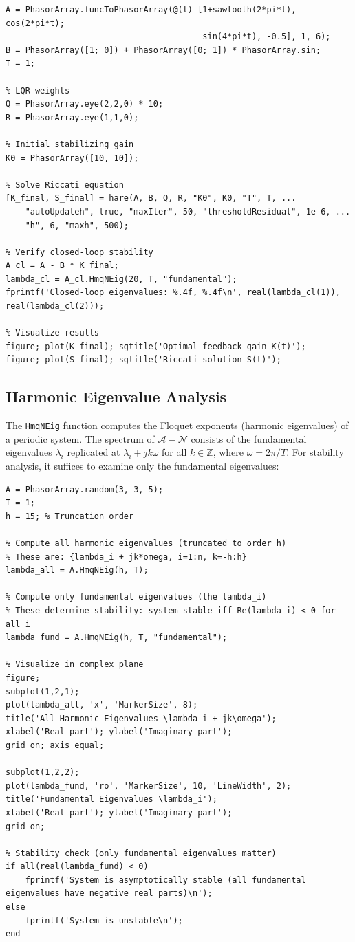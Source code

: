 \documentclass[11pt,a4paper]{article}
\begin{document}
\begin{lstlisting}[style=matlabstyle]
% Define system matrices
A = PhasorArray.funcToPhasorArray(@(t) [1+sawtooth(2*pi*t), cos(2*pi*t); 
                                        sin(4*pi*t), -0.5], 1, 6);
B = PhasorArray([1; 0]) + PhasorArray([0; 1]) * PhasorArray.sin;
T = 1;

% LQR weights
Q = PhasorArray.eye(2,2,0) * 10;
R = PhasorArray.eye(1,1,0);

% Initial stabilizing gain
K0 = PhasorArray([10, 10]);

% Solve Riccati equation
[K_final, S_final] = hare(A, B, Q, R, "K0", K0, "T", T, ...
    "autoUpdateh", true, "maxIter", 50, "thresholdResidual", 1e-6, ...
    "h", 6, "maxh", 500);

% Verify closed-loop stability
A_cl = A - B * K_final;
lambda_cl = A_cl.HmqNEig(20, T, "fundamental");
fprintf('Closed-loop eigenvalues: %.4f, %.4f\n', real(lambda_cl(1)), real(lambda_cl(2)));

% Visualize results
figure; plot(K_final); sgtitle('Optimal feedback gain K(t)');
figure; plot(S_final); sgtitle('Riccati solution S(t)');
\end{lstlisting}

\subsection{Harmonic Eigenvalue Analysis}

The \texttt{HmqNEig} function computes the Floquet exponents (harmonic eigenvalues) of a periodic system. The spectrum of $\mathcal{A} - \mathcal{N}$ consists of the fundamental eigenvalues $\lambda_i$ replicated at $\lambda_i + jk\omega$ for all $k \in \mathbb{Z}$, where $\omega = 2\pi/T$. For stability analysis, it suffices to examine only the fundamental eigenvalues:

\begin{lstlisting}[style=matlabstyle]
% Stability analysis of periodic system
A = PhasorArray.random(3, 3, 5);
T = 1;
h = 15; % Truncation order

% Compute all harmonic eigenvalues (truncated to order h)
% These are: {lambda_i + jk*omega, i=1:n, k=-h:h}
lambda_all = A.HmqNEig(h, T);

% Compute only fundamental eigenvalues (the lambda_i)
% These determine stability: system stable iff Re(lambda_i) < 0 for all i
lambda_fund = A.HmqNEig(h, T, "fundamental");

% Visualize in complex plane
figure;
subplot(1,2,1);
plot(lambda_all, 'x', 'MarkerSize', 8);
title('All Harmonic Eigenvalues \lambda_i + jk\omega');
xlabel('Real part'); ylabel('Imaginary part');
grid on; axis equal;

subplot(1,2,2);
plot(lambda_fund, 'ro', 'MarkerSize', 10, 'LineWidth', 2);
title('Fundamental Eigenvalues \lambda_i');
xlabel('Real part'); ylabel('Imaginary part');
grid on;

% Stability check (only fundamental eigenvalues matter)
if all(real(lambda_fund) < 0)
    fprintf('System is asymptotically stable (all fundamental eigenvalues have negative real parts)\n');
else
    fprintf('System is unstable\n');
end
\end{lstlisting}
\end{document}

